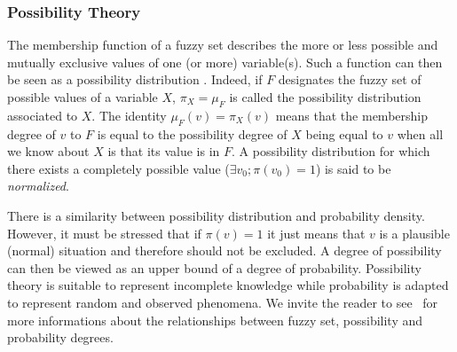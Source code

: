 \documentclass[a4paper]{article}
\newtheorem{definition}{Definition}
\newcounter{ex}
\begin{document}

\subsubsection{Possibility Theory}
\label{PossibilityTheory}

The membership function of a fuzzy set describes the more or less 
possible and mutually exclusive values of one (or more) variable(s).
Such a function can then be seen as a possibility distribution
\cite{Zadeh1978}. Indeed, if $F$ designates the fuzzy set of possible
values of a variable $X$, $\pi_X=\mu_F$ is called the possibility 
distribution associated to $X$. The identity $\mu_F(v)=\pi_X(v)$
means that the membership degree of $v$ to $F$ is equal to the 
possibility degree of $X$ being equal to $v$ when all we know about 
$X$ is that its value is in $F$. A possibility distribution for 
which there exists a completely possible value ($\exists v_0; \pi(v_0) = 1$) 
is said to be \emph{normalized}.

There is a similarity between possibility distribution and probability 
density. However, it must be stressed that if $\pi(v)=1$ it just means that
$v$ is a plausible (normal) situation and therefore should not be excluded.
A degree of possibility
can then be viewed as an upper bound of a degree of probability.
Possibility theory is suitable to represent incomplete knowledge while 
probability is adapted to represent random and observed phenomena. 
We invite the reader to see~\cite{dubois1991} for more informations
about the relationships between fuzzy set, possibility and probability 
degrees.
\end{document}
